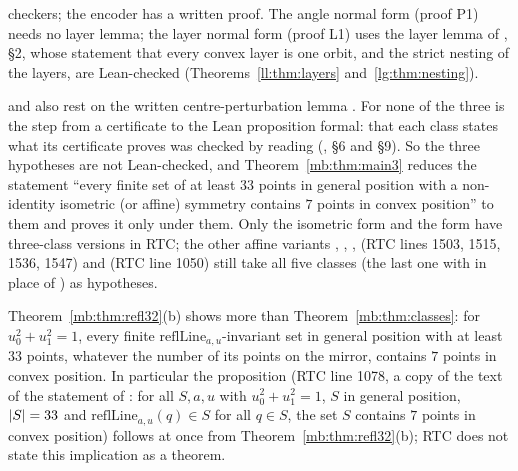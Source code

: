\begin{remark}
\begin{itemize}
  checkers; the encoder has a written proof. The angle normal form (proof P1) needs no layer lemma; the layer normal
  form (proof L1) uses the layer lemma of , \S2, whose statement that every convex layer is one
  orbit, and the strict nesting of the layers, are Lean-checked (Theorems~\ref{ll:thm:layers}
  and~\ref{lg:thm:nesting}).
\end{itemize}
 and  also rest on the written centre-perturbation lemma
. For none of the three is the step from a certificate to the Lean proposition formal: that
each class states what its certificate proves was checked by reading (, \S6 and \S9). So the
three hypotheses are not Lean-checked, and Theorem~\ref{mb:thm:main3} reduces the statement ``every finite set of at
least $33$ points in general position with a non-identity isometric (or affine) symmetry contains $7$ points in convex
position'' to them and proves it only under them. Only the isometric form and the
 form have three-class versions in RTC; the other affine variants
, ,
,  (RTC lines 1503, 1515,
1536, 1547) and  (RTC line 1050) still take all five classes (the last one with
 in place of ) as hypotheses.
\end{remark}

\begin{remark}\label{mb:rem:axis}
Theorem~\ref{mb:thm:refl32}(b) shows more than Theorem~\ref{mb:thm:classes}: for $u_0^2+u_1^2=1$, every finite
$\mathrm{reflLine}_{a,u}$-invariant set in general position with at least $33$ points, whatever the number of its points on the mirror, contains $7$ points
in convex position. In particular the proposition  (RTC line 1078, a copy of the text of
the statement  of : for all $S,a,u$ with $u_0^2+u_1^2=1$, $S$ in general position,
$\lvert S\rvert=33$ and $\mathrm{reflLine}_{a,u}(q)\in S$ for all $q\in S$, the set $S$ contains $7$ points in convex position)
follows at once from Theorem~\ref{mb:thm:refl32}(b); RTC does not state this implication as a theorem.
\end{remark}

